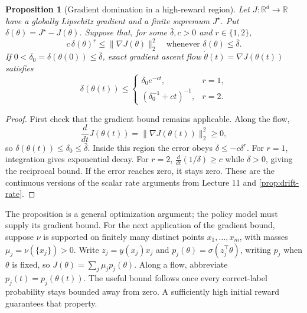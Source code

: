 \documentclass[11pt,twoside]{article}
\newcommand{\R}{\mathbb R}
\newtheorem{proposition}[theorem]{Proposition}
\theoremstyle{definition}
\theoremstyle{remark}
\begin{document}
\begin{proposition}[Gradient domination in a high-reward region]
\label{prop:local-pg}
Let $J:\R^d\to\R$ have a globally Lipschitz gradient and a finite supremum
$J^\star$. Put $\delta(\theta)=J^\star-J(\theta)$. Suppose that, for some
$\bar\delta,c>0$ and $r\in\{1,2\}$,
\[
 c\,\delta(\theta)^r\le\|\nabla J(\theta)\|_2^2
 \quad\text{whenever }\delta(\theta)\le\bar\delta.
\]
If $0<\delta_0=\delta(\theta(0))\le\bar\delta$, exact gradient ascent flow
$\dot\theta(t)=\nabla J(\theta(t))$ satisfies
\[
 \delta(\theta(t))\le
 \begin{cases}
 \delta_0e^{-ct},&r=1,\\
 (\delta_0^{-1}+ct)^{-1},&r=2.
 \end{cases}
\]
\end{proposition}
\begin{proof}
First check that the gradient bound remains applicable. Along the flow,
\[
 \frac{d}{dt}J(\theta(t))=\|\nabla J(\theta(t))\|_2^2\ge0,
\]
so $\delta(\theta(t))\le \delta_0\le\bar\delta$. Inside this region the error obeys
$\dot\delta\le-c\delta^r$. For $r=1$, integration gives exponential decay.
For $r=2$, $\frac{d}{dt}(1/\delta)\ge c$ while $\delta>0$, giving the reciprocal
bound. If the error reaches zero, it stays zero. These are the continuous
versions of the scalar rate arguments from Lecture 11 and
\cref{prop:drift-rate}.
\end{proof}

The proposition is a general optimization argument; the policy model must
supply its gradient bound.
For the next application of the gradient bound, suppose $\nu$ is supported on
finitely many distinct points $x_1,\ldots,x_m$, with masses
$\mu_j=\nu(\{x_j\})>0$. Write $z_j=y(x_j)x_j$ and
$p_j(\theta)=\sigma(z_j^\top\theta)$, writing $p_j$ when $\theta$ is fixed, so
$J(\theta)=\sum_j\mu_jp_j(\theta)$. Along a flow, abbreviate
$p_j(t)=p_j(\theta(t))$.
The useful bound follows once every correct-label probability stays
bounded away from zero. A sufficiently high initial reward guarantees
that property.
\end{document}

